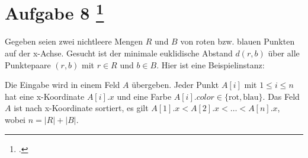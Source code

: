 \documentclass{lehramt-informatik-aufgabe}
\begin{document}

\section{Aufgabe 8
\footcite{66115:2020:03}}

Gegeben seien zwei nichtleere Mengen $R$ und $B$ von roten bzw. blauen
Punkten auf der x-Achse. Gesucht ist der minimale euklidische Abstand
$d(r, b)$ über alle Punktepaare $(r,b)$ mit $r \in R$ und $b \in B$.
Hier ist eine Beispielinstanz:

Die Eingabe wird in einem Feld $A$ übergeben. Jeder Punkt $A[i]$ mit $1
\leq i \leq n$ hat eine x-Koordinate $A[i].x$ und eine Farbe $A[i].color
\in \{ \text{rot}, \text{blau} \}$. Das Feld $A$ ist nach x-Koordinate
sortiert, \dh es gilt $A[1].x < A[2].x < \dots < A[n].x$, wobei $n = |R|
+ |B|$.
\end{document}
